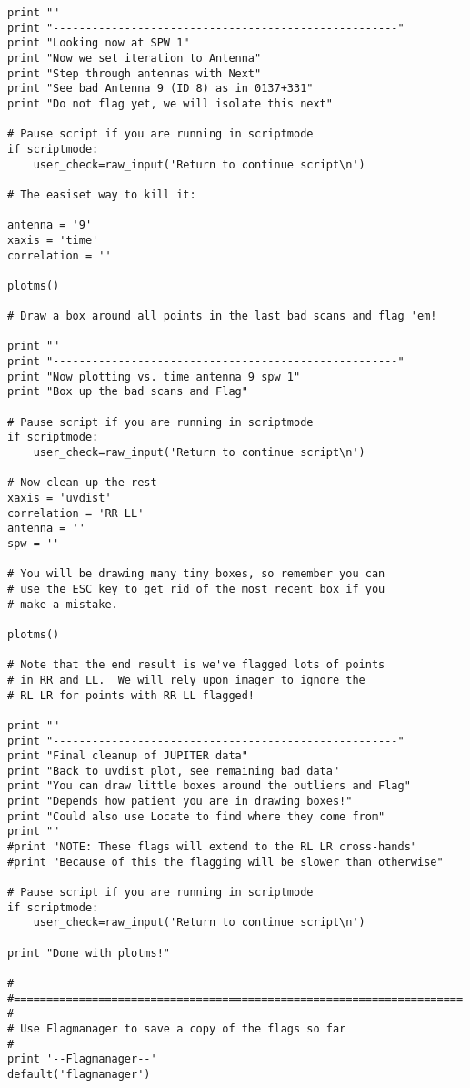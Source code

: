 \begin{verbatim}
print ""
print "-----------------------------------------------------"
print "Looking now at SPW 1"
print "Now we set iteration to Antenna"
print "Step through antennas with Next"
print "See bad Antenna 9 (ID 8) as in 0137+331"
print "Do not flag yet, we will isolate this next"

# Pause script if you are running in scriptmode
if scriptmode:
    user_check=raw_input('Return to continue script\n')

# The easiset way to kill it:

antenna = '9'
xaxis = 'time'
correlation = ''

plotms()

# Draw a box around all points in the last bad scans and flag 'em!

print ""
print "-----------------------------------------------------"
print "Now plotting vs. time antenna 9 spw 1"
print "Box up the bad scans and Flag"

# Pause script if you are running in scriptmode
if scriptmode:
    user_check=raw_input('Return to continue script\n')

# Now clean up the rest
xaxis = 'uvdist'
correlation = 'RR LL'
antenna = ''
spw = ''

# You will be drawing many tiny boxes, so remember you can
# use the ESC key to get rid of the most recent box if you
# make a mistake.

plotms()

# Note that the end result is we've flagged lots of points
# in RR and LL.  We will rely upon imager to ignore the
# RL LR for points with RR LL flagged!

print ""
print "-----------------------------------------------------"
print "Final cleanup of JUPITER data"
print "Back to uvdist plot, see remaining bad data"
print "You can draw little boxes around the outliers and Flag"
print "Depends how patient you are in drawing boxes!"
print "Could also use Locate to find where they come from"
print ""
#print "NOTE: These flags will extend to the RL LR cross-hands"
#print "Because of this the flagging will be slower than otherwise"

# Pause script if you are running in scriptmode
if scriptmode:
    user_check=raw_input('Return to continue script\n')

print "Done with plotms!"

#
#=====================================================================
#
# Use Flagmanager to save a copy of the flags so far
#
print '--Flagmanager--'
default('flagmanager')


\end{verbatim}
